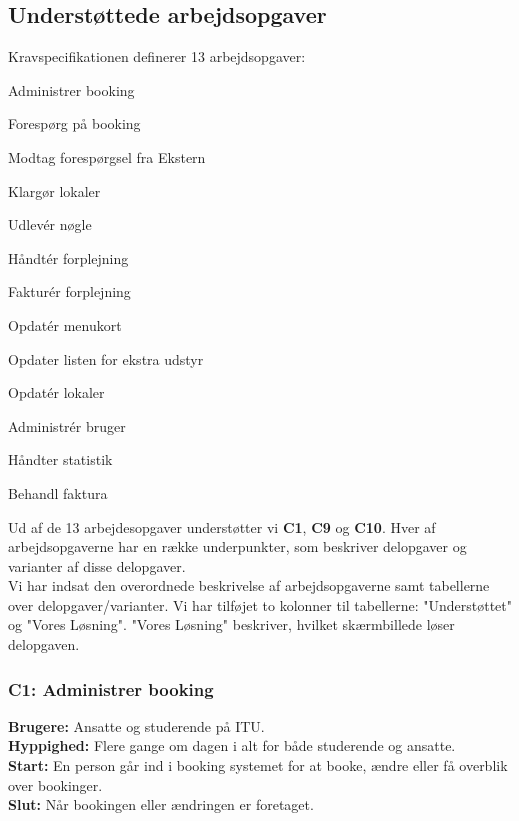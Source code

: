 \subsection{Understøttede arbejdsopgaver}
\label{Evaluation_KS_workareas}
Kravspecifikationen definerer 13 arbejdsopgaver:
\begin{my_description}
\item[\textbf{C1.}]{Administrer booking}
\item[\textbf{C2.}]{Forespørg på booking}
\item[\textbf{C3.}]{Modtag forespørgsel fra Ekstern}
\item[\textbf{C4.}]{Klargør lokaler}
\item[\textbf{C5.}]{Udlevér nøgle}
\item[\textbf{C6.}]{Håndtér forplejning}
\item[\textbf{C7.}]{Fakturér forplejning}
\item[\textbf{C8.}]{Opdatér menukort}
\item[\textbf{C9.}]{Opdater listen for ekstra udstyr}
\item[\textbf{C10.}]{Opdatér lokaler}
\item[\textbf{C11.}]{Administrér bruger}
\item[\textbf{C12.}]{Håndter statistik}
\item[\textbf{C13.}]{Behandl faktura}
\end{my_description}

Ud af de 13 arbejdesopgaver understøtter vi \textbf{C1}, \textbf{C9} og \textbf{C10}. Hver af arbejdsopgaverne har en række underpunkter, som beskriver delopgaver og varianter af disse delopgaver. 
\\Vi har indsat den overordnede beskrivelse af arbejdsopgaverne samt tabellerne over delopgaver/varianter. Vi har tilføjet to kolonner til tabellerne: "Understøttet" og "Vores Løsning". "Vores Løsning" beskriver, hvilket skærmbillede løser delopgaven.

\subsubsection{C1: Administrer booking}
\textbf{Brugere:} Ansatte og studerende på ITU.\\
\textbf{Hyppighed:} Flere gange om dagen i alt for både studerende og ansatte.\\
\textbf{Start:} En person går ind i booking systemet for at booke, ændre eller få overblik over bookinger.\\
\textbf{Slut:} Når bookingen eller ændringen er foretaget.

